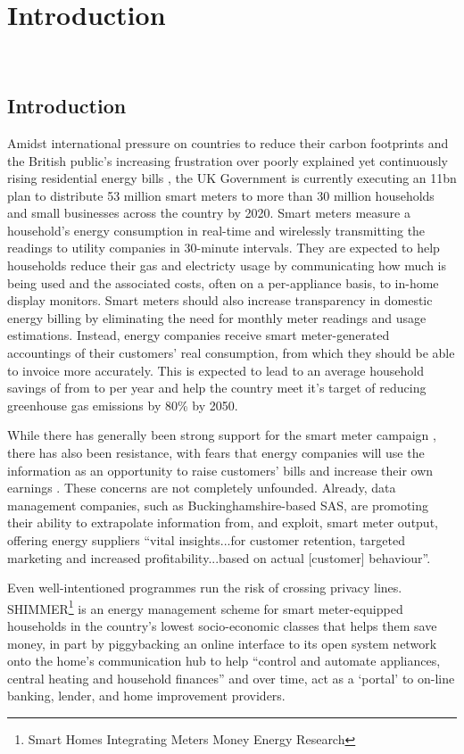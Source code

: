 \chapter{Introduction}\
\section{Introduction}
Amidst international pressure on countries to reduce their carbon footprints \cite{E_spending} and the British public's increasing frustration over poorly explained yet continuously rising residential energy bills \cite{E_spending}, the UK Government is currently executing an \textsterling 11bn plan to distribute 53 million smart meters to more than 30 million households and small businesses across the country by 2020. Smart meters measure a household's energy consumption in real-time and wirelessly transmitting the readings to utility companies in 30-minute intervals.  They are expected to help households reduce their gas and electricty usage by communicating how much is being used and the associated costs, often on a per-appliance basis, to in-home display monitors.  Smart meters should also increase transparency in domestic energy billing by eliminating the need for monthly meter readings and usage estimations. Instead, energy companies receive smart meter-generated accountings of their customers' real consumption, from which they should be able to invoice more accurately.  This is expected to lead to an average household savings of from  to  per year and help the country meet it's target of reducing greenhouse gas emissions by 80\% by 2050. 

While there has generally been strong support for the smart meter campaign \cite{DECC_1}, there has also been resistance, with fears that energy companies will use the information as an opportunity to raise customers' bills and increase their own earnings \cite{stop,Anderson}. These concerns are not completely unfounded.  Already, data management companies, such as Buckinghamshire-based SAS, are promoting their ability to extrapolate information from, and exploit, smart meter output, offering energy suppliers ``vital insights...for customer retention, targeted marketing and increased profitability...based on actual [customer] behaviour''\cite{SAS}. 

Even well-intentioned programmes run the risk of crossing privacy lines. SHIMMER\footnote{Smart Homes Integrating Meters Money Energy Research} is an energy management scheme for smart meter-equipped households in the country's lowest socio-economic classes that helps them save money, in part by piggybacking an online interface to its open system network onto the home's communication hub to help ``control and automate appliances, central heating and household finances'' and over time, act as a `portal' to on-line banking, lender, and home improvement providers. 

